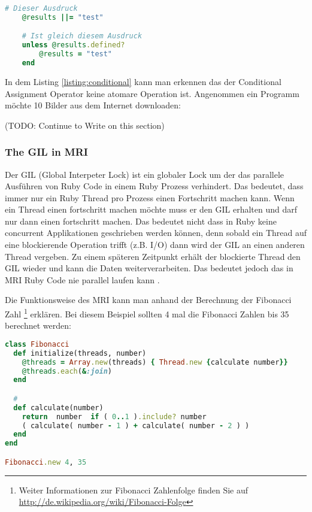\begin{lstlisting}[language=Ruby,label={listing:conditional}, caption={Adaptiert von \cite{Sto2013}, Seite 24}]
	# Dieser Ausdruck
	@results ||= "test" 

	# Ist gleich diesem Ausdruck
	unless @results.defined?
		@results = "test"
	end
\end{lstlisting} 

In dem Listing \ref{listing:conditional} kann man erkennen das der Conditional Assignment Operator keine atomare Operation ist. Angenommen ein Programm möchte 10 Bilder aus dem Internet downloaden:

(TODO: Continue to Write on this section)

\subsubsection{The GIL in MRI}

Der GIL (Global Interpeter Lock) ist ein globaler Lock um der das parallele Ausführen von Ruby Code in einem Ruby Prozess verhindert. Das bedeutet, dass immer nur ein Ruby Thread pro Prozess einen Fortschritt machen kann. Wenn ein Thread einen fortschritt machen möchte muss er den GIL erhalten und darf nur dann einen fortschritt machen. Das bedeutet nicht dass in Ruby keine concurrent Applikationen geschrieben werden können, denn sobald ein Thread auf eine blockierende Operation trifft (z.B. I/O) dann wird der GIL an einen anderen Thread vergeben. Zu einem späteren Zeitpunkt erhält der blockierte Thread den GIL wieder und kann die Daten weiterverarbeiten. Das bedeutet jedoch das in MRI Ruby Code nie parallel laufen kann \cite[p. 42]{Sto2013}. 

Die Funktionsweise des MRI kann man anhand der Berechnung der Fibonacci Zahl \footnote{Weiter Informationen zur Fibonacci Zahlenfolge finden Sie auf \url{http://de.wikipedia.org/wiki/Fibonacci-Folge}} erklären. Bei diesem Beispiel sollten 4 mal die Fibonacci Zahlen bis 35 berechnet werden:

\begin{lstlisting}[language=Ruby,label={listing:fibonacci},caption={Adaptiert von \cite{Sto2013}, Seite 21}]
class Fibonacci
  def initialize(threads, number)
    @threads = Array.new(threads) { Thread.new {calculate number}}
    @threads.each(&:join)
  end

  #
  def calculate(number)
    return  number  if ( 0..1 ).include? number
    ( calculate( number - 1 ) + calculate( number - 2 ) )
  end
end

Fibonacci.new 4, 35
\end{lstlisting}

